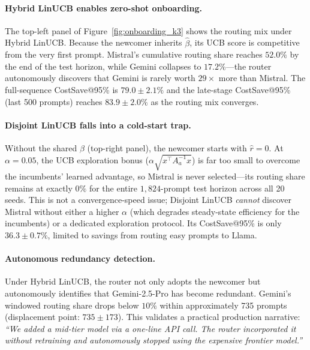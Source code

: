 \paragraph{Hybrid LinUCB enables zero-shot onboarding.}
The top-left panel of Figure~\ref{fig:onboarding_k3} shows the
routing mix under Hybrid LinUCB.
Because the newcomer inherits $\hat{\beta}$, its UCB score is
competitive from the very first prompt.
Mistral's cumulative routing share reaches $52.0\%$ by the end of
the test horizon, while Gemini collapses to $17.2\%$---the router
autonomously discovers that Gemini is rarely worth $29{\times}$ more
than Mistral.
The full-sequence CostSave@95\% is $79.0 \pm 2.1\%$ and the
late-stage CostSave@95\% (last 500 prompts) reaches $83.9 \pm 2.0\%$
as the routing mix converges.

\paragraph{Disjoint LinUCB falls into a cold-start trap.}
Without the shared $\beta$ (top-right panel), the newcomer starts
with $\hat{r} = 0$.
At $\alpha{=}0.05$, the UCB exploration bonus
($\alpha\sqrt{x^\top A_a^{-1} x}$) is far too small to
overcome the incumbents' learned advantage, so Mistral is never
selected---its routing share remains at exactly $0\%$ for the
entire $1{,}824$-prompt test horizon across all 20 seeds.
This is not a convergence-speed issue; Disjoint LinUCB
\emph{cannot} discover Mistral without either a higher $\alpha$
(which degrades steady-state efficiency for the incumbents) or a
dedicated exploration protocol.
Its CostSave@95\% is only $36.3 \pm 0.7\%$, limited to savings
from routing easy prompts to Llama.

\paragraph{Autonomous redundancy detection.}
Under Hybrid LinUCB, the router not only adopts the newcomer
but autonomously identifies that Gemini-2.5-Pro has become
redundant.
Gemini's windowed routing share drops below $10\%$ within
approximately 735 prompts (displacement point: $735 \pm 173$).
This validates a practical production narrative:
\emph{``We added a mid-tier model via a one-line API call.
The router incorporated it without retraining and autonomously
stopped using the expensive frontier model.''}

